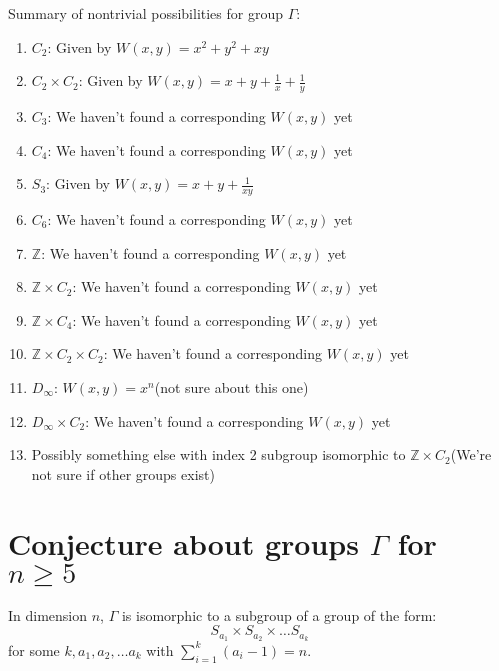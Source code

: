\documentclass[a4paper]{article}
\begin{document}
    Summary of nontrivial possibilities for group $\Gamma$:
    \begin{enumerate}
    	\item $C_2$: Given by $W(x,y) = x^2 + y^2+ x y$ 
    	\item $C_2 \times C_2$: Given by $W(x,y) = x+ y +\frac{1}{x}+\frac{1}{y}$
    	\item $C_3$: We haven't found a corresponding $W(x,y)$ yet
    	\item $C_4$: We haven't found a corresponding $W(x,y)$ yet
    	\item $S_3$: Given by $W(x,y) = x + y +\frac{1}{xy}$
    	\item $C_6$: We haven't found a corresponding $W(x,y)$ yet
    	\item $\mathbb{Z}$: We haven't found a corresponding $W(x,y)$ yet
    	\item $\mathbb{Z} \times C_2$: We haven't found a corresponding $W(x,y)$ yet
    	\item $\mathbb{Z} \times C_4$: We haven't found a corresponding $W(x,y)$ yet
    	\item $\mathbb{Z} \times C_2 \times C_2$: We haven't found a corresponding $W(x,y)$ yet
    	\item $D_\infty$: $W(x,y) = x^n$(not sure about this one)
    	\item $D_\infty \times C_2$: We haven't found a corresponding $W(x,y)$ yet
    	\item Possibly something else with index 2 subgroup isomorphic to $\mathbb{Z} \times C_2$(We're not sure if other groups exist)
    \end{enumerate}
	\section{Conjecture about groups $\Gamma$ for $n \geq 5$}
		In dimension $n$, $\Gamma$ is isomorphic to a subgroup of a group of the form:
		$$S_{a_1} \times S_{a_2} \times \dots S_{a_k}$$ for some $k, a_1, a_2, \dots a_k$ with $\sum_{i=1}^k (a_i - 1) = n$.
\end{document}
